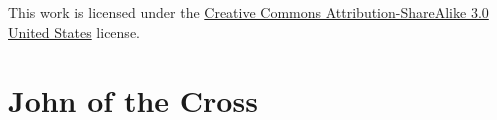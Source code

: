 

\frontmatter
\thispagestyle{empty}
\vspace*{\fill}
\clearpage

\thispagestyle{empty}
\vspace*{\fill}
\begin{center}
	{\footnotesize\noindent This work is licensed under the \href{http://creativecommons.org/licenses/by-sa/3.0/us/}{Creative Commons Attribution-ShareAlike 3.0 United States} license.}\bigskip
\end{center}
\vspace*{2in}

\mainmatter
\chapter*{John of the Cross}
	

